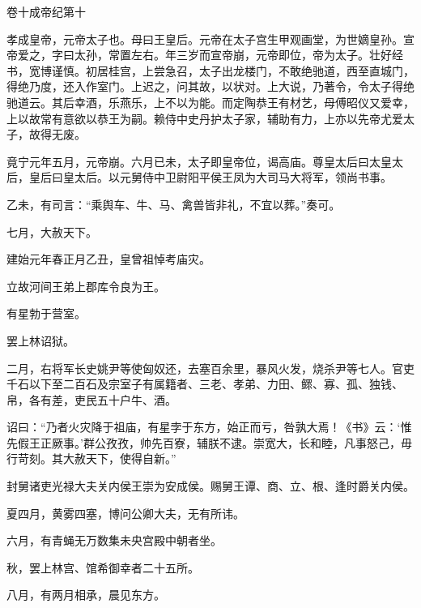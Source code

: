 \documentclass[12pt,UTF8]{ctexbook}
\begin{document}
卷十成帝纪第十



孝成皇帝，元帝太子也。母曰王皇后。元帝在太子宫生甲观画堂，为世嫡皇孙。宣帝爱之，字曰太孙，常置左右。年三岁而宣帝崩，元帝即位，帝为太子。壮好经书，宽博谨慎。初居桂宫，上尝急召，太子出龙楼门，不敢绝驰道，西至直城门，得绝乃度，还入作室门。上迟之，问其故，以状对。上大说，乃著令，令太子得绝驰道云。其后幸酒，乐燕乐，上不以为能。而定陶恭王有材艺，母傅昭仪又爱幸，上以故常有意欲以恭王为嗣。赖侍中史丹护太子家，辅助有力，上亦以先帝尤爱太子，故得无废。



竟宁元年五月，元帝崩。六月已未，太子即皇帝位，谒高庙。尊皇太后曰太皇太后，皇后曰皇太后。以元舅侍中卫尉阳平侯王凤为大司马大将军，领尚书事。



乙未，有司言：“乘舆车、牛、马、禽兽皆非礼，不宜以葬。”奏可。



七月，大赦天下。



建始元年春正月乙丑，皇曾祖悼考庙灾。



立故河间王弟上郡库令良为王。



有星勃于营室。



罢上林诏狱。



二月，右将军长史姚尹等使匈奴还，去塞百余里，暴风火发，烧杀尹等七人。官吏千石以下至二百石及宗室子有属籍者、三老、孝弟、力田、鳏、寡、孤、独钱、帛，各有差，吏民五十户牛、酒。



诏曰：“乃者火灾降于祖庙，有星孛于东方，始正而亏，咎孰大焉！《书》云：‘惟先假王正厥事。’群公孜孜，帅先百寮，辅朕不逮。崇宽大，长和睦，凡事怒己，毋行苛刻。其大赦天下，使得自新。”



封舅诸吏光禄大夫关内侯王崇为安成侯。赐舅王谭、商、立、根、逢时爵关内侯。



夏四月，黄雾四塞，博问公卿大夫，无有所讳。



六月，有青蝇无万数集未央宫殿中朝者坐。



秋，罢上林宫、馆希御幸者二十五所。



八月，有两月相承，晨见东方。
\end{document}
